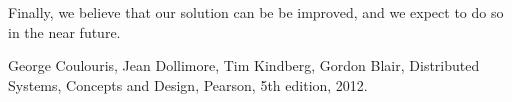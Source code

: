 \documentclass[times, 10pt,twocolumn]{article}
\begin{document}
Finally, we believe that our solution can be be improved, and we expect to do so in the near future.





\begin{thebibliography}{9}
 
George Coulouris, Jean Dollimore, Tim Kindberg, Gordon Blair,
   Distributed Systems, Concepts and Design, 
   Pearson,
   5th edition,
   2012.

\end{thebibliography}
\end{document}
